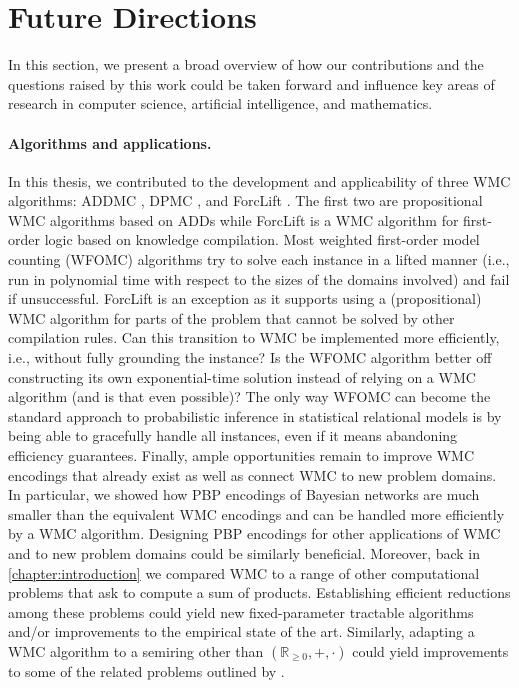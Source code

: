 \section{Future Directions}\label{sec:future}

In this section, we present a broad overview of how our contributions and the
questions raised by this work could be taken forward and influence key areas of
research in computer science, artificial intelligence, and mathematics.

\paragraph*{Algorithms and applications.}
In this thesis, we contributed to the development and applicability of three WMC
algorithms: ADDMC \citep{DBLP:conf/aaai/DudekPV20}, DPMC
\citep{DBLP:conf/cp/DudekPV20}, and ForcLift
\citep{DBLP:conf/ijcai/BroeckTMDR11}. The first two are propositional WMC
algorithms based on ADDs while ForcLift is a WMC algorithm for first-order logic
based on knowledge compilation. Most weighted first-order model counting (WFOMC)
algorithms try to solve each instance in a lifted manner (i.e., run in
polynomial time with respect to the sizes of the domains involved) and fail if
unsuccessful. ForcLift is an exception as it supports using a (propositional)
WMC algorithm for parts of the problem that cannot be solved by other
compilation rules. Can this transition to WMC be implemented more efficiently,
i.e., without fully grounding the instance? Is the WFOMC algorithm better off
constructing its own exponential-time solution instead of relying on a WMC
algorithm (and is that even possible)? The only way WFOMC can become the
standard approach to probabilistic inference in statistical relational models is
by being able to gracefully handle all instances, even if it means abandoning
efficiency guarantees. Finally, ample opportunities remain to improve WMC
encodings that already exist as well as connect WMC to new problem domains. In
particular, we showed how PBP encodings of Bayesian networks are much smaller
than the equivalent WMC encodings and can be handled more efficiently by a WMC
algorithm. Designing PBP encodings for other applications of WMC and to new
problem domains could be similarly beneficial. Moreover, back in
\cref{chapter:introduction} we compared WMC to a range of other computational
problems that ask to compute a sum of products. Establishing efficient
reductions among these problems could yield new fixed-parameter tractable
algorithms and/or improvements to the empirical state of the art. Similarly,
adapting a WMC algorithm to a semiring other than
$(\mathbb{R}_{\ge 0}, +, \cdot)$ could yield improvements to some of the related
problems outlined by \citet{DBLP:journals/japll/KimmigBR17}.

